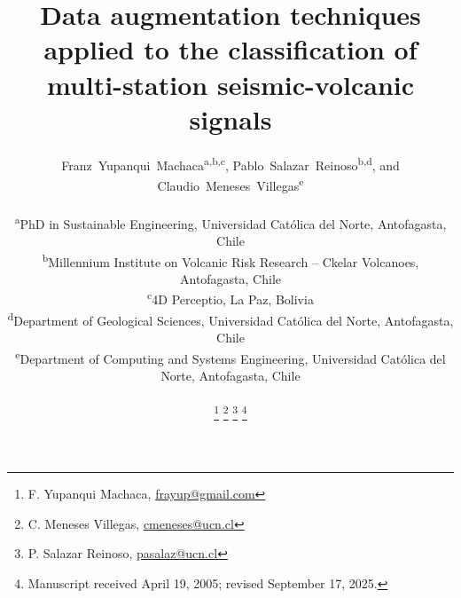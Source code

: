 \documentclass[journal]{IEEEtran}
\begin{document}
%
\title{Data augmentation techniques applied to the classification of multi-station seismic-volcanic signals}
%
%
%

\author{Franz~Yupanqui~Machaca\textsuperscript{a,b,c}, Pablo~Salazar~Reinoso\textsuperscript{b,d}, and
  Claudio~Meneses~Villegas\textsuperscript{e}\\
  \vspace{1mm}
  \begin{flushleft}
  \small\textsuperscript{a}PhD in Sustainable Engineering, Universidad Católica del Norte, Antofagasta, Chile\\
  \textsuperscript{b}Millennium Institute on Volcanic Risk Research – Ckelar Volcanoes, Antofagasta, Chile\\
  \textsuperscript{c}4D Perceptio, La Paz, Bolivia\\
  \textsuperscript{d}Department of Geological Sciences, Universidad Católica del Norte, Antofagasta, Chile\\
  \textsuperscript{e}Department of Computing and Systems Engineering, Universidad Católica del Norte, Antofagasta, Chile\\
  \end{flushleft}
  \thanks{F. Yupanqui Machaca, \color{blue}\href{mailto:frayup@gmail.com}{frayup@gmail.com} }
  \thanks{C. Meneses Villegas, \color{blue}\href{mailto:cmeneses@ucn.cl}{cmeneses@ucn.cl} }
  \thanks{P. Salazar Reinoso, \color{blue}\href{mailto:pasalaz@ucn.cl}{pasalaz@ucn.cl} }
  \thanks{Manuscript received April 19, 2005; revised September 17, 2025.}
}
\end{document}
